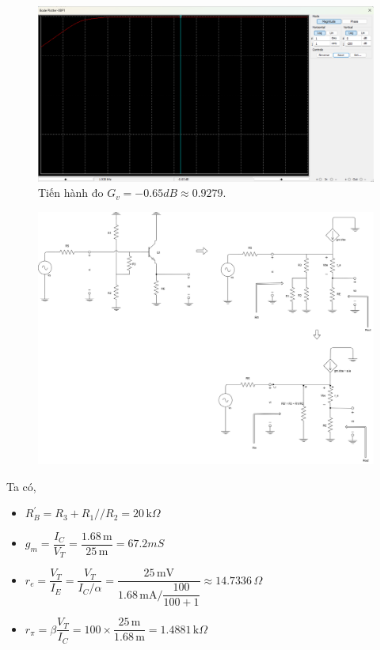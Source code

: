 \begin{itemize}[label=-]
	\begin{figure}[H]
		\centering
		\includegraphics[width=.8\linewidth]{./my-chapters/my-images/Question4/b_GV_bode.png}
		\caption{Tiến hành đo $G_{v} = -0.65dB \approx 0.9279$.}
	\end{figure}
\end{itemize}


\begin{figure}[H]
	\centering
	\includegraphics[width=.9\linewidth]{./my-chapters/my-diagrams/Question4/cauc_t.png}
\end{figure}

Ta có, 

\begin{itemize}[label=+, leftmargin=2cm]
	\item $R_{B}^{'} = R_{3} + R_{1} // R_{2} = 20\,\text{k}\Omega$
	\item $g_{m} = \dfrac{I_{C}}{V_{T}} =  \dfrac{1.68\,\text{m}}{25\,\text{m}} = 67.2mS$
	\item $r_{e} = \dfrac{V_{T}}{I_{E}} = \dfrac{V_{T}}{I_{C}/\alpha} = \dfrac{25\,\text{mV}}{1.68\,\text{mA} / \dfrac{100}{100+1}} \approx 14.7336\,\Omega$
	\item $r_{\pi} = \beta \dfrac{V_{T}}{I_{C}} = 100\times\dfrac{25\,\text{m}}{1.68\,\text{m}} = 1.4881\,\text{k}\Omega$
\end{itemize}

